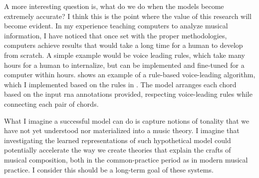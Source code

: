 

A more interesting question is, what do we do when the
models become extremely accurate? I think this is the point
where the value of this research will become evident. In my
experience teaching computers to analyze musical
information, I have noticed that once set with the proper
methodologies, computers achieve results that would take a
long time for a human to develop from scratch. A simple
example would be voice leading rules, which take many hours
for a human to internalize, but can be implemented and
fine-tuned for a computer within hours.
 shows an example of a
rule-based voice-leading algorithm, which I implemented
based on the rules in
\textcite{huron2016voice}.
The model arranges each chord based on the input \gls{rna}
annotations provided, respecting voice-leading rules while
connecting each pair of chords. 


What I imagine a successful model can do is capture notions
of tonality that we have not yet understood nor materialized
into a music theory. I imagine that investigating the
learned representations of such hypothetical model could
potentially accelerate the way we create theories that
explain the crafts of musical composition, both in the
common-practice period as in modern musical practice. I
consider this should be a long-term goal of these systems.
